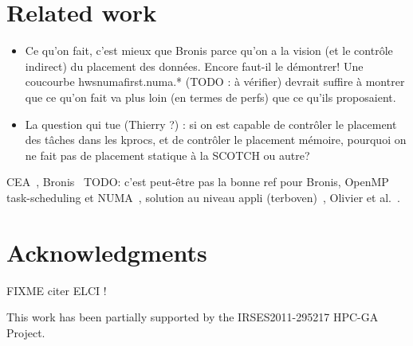 \documentclass{Styles/llncs}
\begin{document}
\section{Related work}
\begin{itemize}
\item Ce qu'on fait, c'est mieux que Bronis parce qu'on a la vision
  (et le contrôle indirect) du placement des données. Encore faut-il
  le démontrer! Une coucourbe hwsnumafirst.numa.* (TODO : à vérifier)
  devrait suffire à montrer que ce qu'on fait va plus loin (en termes
  de perfs) que ce qu'ils proposaient.
\item La question qui tue (Thierry ?) : si on est capable de contrôler le
  placement des tâches dans les kprocs, et de contrôler le placement
  mémoire, pourquoi on ne fait pas de placement statique à la SCOTCH
  ou autre?
\end{itemize}

CEA~\cite{DBLP:conf/europar/Clet-OrtegaCP14},
Bronis~\cite{DBLP:journals/sp/OlivierSSP13} TODO: c'est peut-être pas
la bonne ref pour Bronis, OpenMP task-scheduling et
NUMA~\cite{DBLP:journals/corr/Tahan14}, solution au niveau appli
(terboven)~\cite{DBLP:conf/europar/TerbovenSCM12}, Olivier et al.~\cite{DBLP:journals/ijhpca/OlivierPWSP12}.


\section*{Acknowledgments}

FIXME citer ELCI !

This work has been partially supported by the IRSES2011-295217
HPC-GA Project.

  \small 
  
\end{document}
